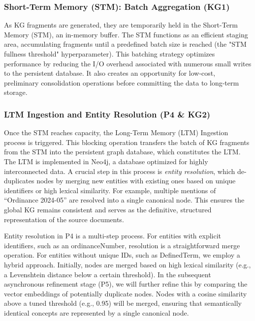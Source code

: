\subsubsection{Short-Term Memory (STM): Batch Aggregation (KG1)}
As KG fragments are generated, they are temporarily held in the Short-Term Memory (STM), an in-memory buffer. The STM functions as an efficient staging area, accumulating fragments until a predefined batch size is reached (the "STM fullness threshold" hyperparameter). This batching strategy optimizes performance by reducing the I/O overhead associated with numerous small writes to the persistent database. It also creates an opportunity for low-cost, preliminary consolidation operations before committing the data to long-term storage.

\subsubsection{LTM Ingestion and Entity Resolution (P4 \& KG2)}
Once the STM reaches capacity, the Long-Term Memory (LTM) Ingestion process is triggered. This blocking operation transfers the batch of KG fragments from the STM into the persistent graph database, which constitutes the LTM. The LTM is implemented in Neo4j, a database optimized for highly interconnected data. A crucial step in this process is \textit{entity resolution}, which de-duplicates nodes by merging new entities with existing ones based on unique identifiers or high lexical similarity. For example, multiple mentions of ``Ordinance 2024-05'' are resolved into a single canonical node. This ensures the global KG remains consistent and serves as the definitive, structured representation of the source documents.

Entity resolution in P4 is a multi-step process. For entities with explicit identifiers, such as an ordinanceNumber, resolution is a straightforward merge operation. For entities without unique IDs, such as DefinedTerm, we employ a hybrid approach. Initially, nodes are merged based on high lexical similarity (e.g., a Levenshtein distance below a certain threshold). In the subsequent asynchronous refinement stage (P5), we will further refine this by comparing the vector embeddings of potentially duplicate nodes. Nodes with a cosine similarity above a tuned threshold (e.g., 0.95) will be merged, ensuring that semantically identical concepts are represented by a single canonical node.

